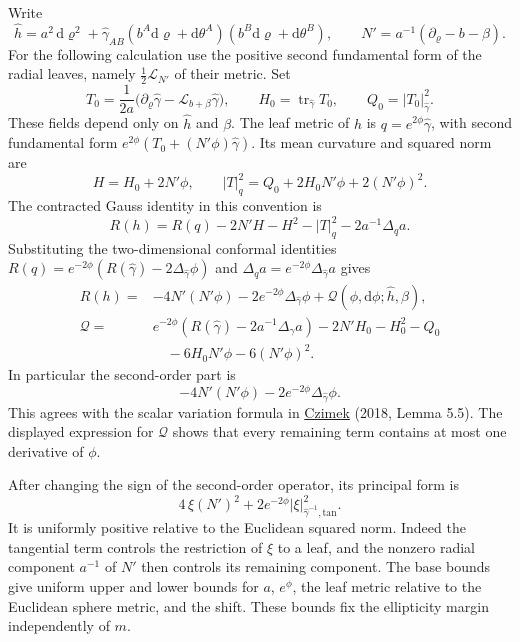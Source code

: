 \documentclass[
  english,
  11pt,
  reqno]{amsart}
\begin{document}
Write \[
\widehat h=a^2\,\mathrm d\varrho^2+
\widehat\gamma_{AB}
(b^A\mathrm d\varrho+\mathrm d\theta^A)
(b^B\mathrm d\varrho+\mathrm d\theta^B),
\qquad
N'=a^{-1}(\partial_\varrho-b-\beta).
\] For the following calculation use the positive second fundamental
form of the radial leaves, namely \(\tfrac12\mathcal L_{N'}\) of their
metric. Set \[
T_0=\frac1{2a}
\bigl(\partial_\varrho\widehat\gamma
-\mathcal L_{b+\beta}\widehat\gamma\bigr),
\qquad H_0=\operatorname{tr}_{\widehat\gamma}T_0,
\qquad Q_0=|T_0|_{\widehat\gamma}^2.
\] These fields depend only on \(\widehat h\) and \(\beta\). The leaf
metric of \(h\) is \(q=e^{2\phi}\widehat\gamma\), with second
fundamental form \(e^{2\phi}(T_0+(N'\phi)\widehat\gamma)\). Its mean
curvature and squared norm are \[
H=H_0+2N'\phi,
\qquad
|T|_q^2=Q_0+2H_0N'\phi+2(N'\phi)^2.
\] The contracted Gauss identity in this convention is \[
R(h)=R(q)-2N'H-H^2-|T|_q^2-2a^{-1}\Delta_q a.
\] Substituting the two-dimensional conformal identities
\(R(q)=e^{-2\phi}(R(\widehat\gamma)-2\Delta_{\widehat\gamma}\phi)\) and
\(\Delta_q a=e^{-2\phi}\Delta_{\widehat\gamma}a\) gives%
 \[
\begin{aligned}
R(h)={}&-4N'(N'\phi)
-2e^{-2\phi}\Delta_{\widehat\gamma}\phi
+\mathcal Q(\phi,\mathrm d\phi;\widehat h,\beta),\\
\mathcal Q={}&
e^{-2\phi}\left(R(\widehat\gamma)
-2a^{-1}\Delta_{\widehat\gamma}a\right)
-2N'H_0-H_0^2-Q_0\\
&\quad-6H_0N'\phi-6(N'\phi)^2.
\end{aligned}
\] In particular the second-order part is%
 \[
-4N'(N'\phi)-2e^{-2\phi}\Delta_{\widehat\gamma}\phi.
\] This agrees with the scalar variation formula in
\hyperref[ref-Czimek2018]{Czimek} (2018, Lemma 5.5). The displayed
expression for \(\mathcal Q\) shows that every remaining term contains
at most one derivative of \(\phi\).

After changing the sign of the second-order operator, its principal form
is%
 \[
4\,\xi(N')^2+
2e^{-2\phi}|\xi|^2_{\widehat\gamma^{-1},\mathrm{tan}}.
\] It is uniformly positive relative to the Euclidean squared norm.
Indeed the tangential term controls the restriction of \(\xi\) to a
leaf, and the nonzero radial component \(a^{-1}\) of \(N'\) then
controls its remaining component. The base bounds give uniform upper and
lower bounds for \(a\), \(e^\phi\), the leaf metric relative to the
Euclidean sphere metric, and the shift. These bounds fix the ellipticity
margin independently of \(m\).
\end{document}
